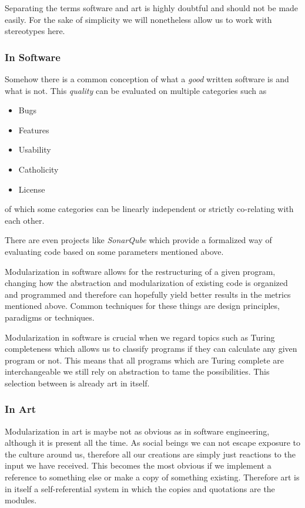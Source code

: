 \documentclass[10pt,twocolumn,letterpaper]{article}
\begin{document}
Separating the terms software and art is highly doubtful and should not be made easily.
For the sake of simplicity we will nonetheless allow us to work with stereotypes here.

\subsubsection*{In Software}

Somehow there is a common conception of what a \textit{good} written software is and what is not.
This \textit{quality} can be evaluated on multiple categories such as

\begin{itemize}
    \item Bugs
    \item Features
    \item Usability
    \item Catholicity
    \item License
\end{itemize}

of which some categories can be linearly independent or strictly co-relating with each other.

There are even projects like \textit{SonarQube} which provide a formalized way of evaluating code based on some
parameters mentioned above.

Modularization in software allows for the restructuring of a given program, changing how the abstraction and
modularization of existing code is organized and programmed and therefore can hopefully yield better
results in the metrics mentioned above.
Common techniques for these things are design principles, paradigms or techniques.

Modularization in software is crucial when we regard topics such as Turing completeness which allows us
to classify programs if they can calculate any given program or not.
This means that all programs which are Turing complete are interchangeable we still rely on abstraction to
tame the possibilities.
This selection between is already art in itself.

\subsubsection*{In Art}

Modularization in art is maybe not as obvious as in software engineering, although it is present all the time.
As social beings we can not escape exposure to the culture around us, therefore all our creations
are simply just reactions to the input we have received.
This becomes the most obvious if we implement a reference to something else or make a copy of something existing.
Therefore art is in itself a self-referential system in which the copies and quotations are the modules.
\end{document}

